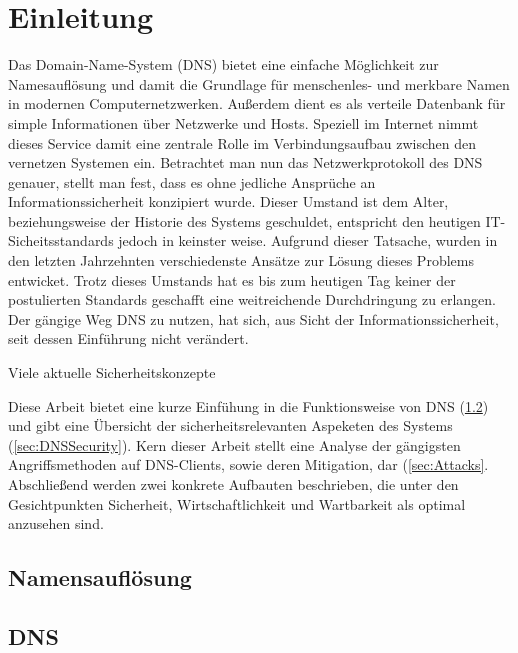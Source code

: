 \chapter{Einleitung}
Das Domain-Name-System (DNS) bietet eine einfache Möglichkeit zur Namesauflösung und damit die Grundlage für menschenles- und merkbare Namen in modernen Computernetzwerken. Außerdem dient es als verteile Datenbank für simple Informationen über Netzwerke und Hosts. Speziell im Internet nimmt dieses Service damit eine zentrale Rolle im Verbindungsaufbau zwischen den vernetzen Systemen ein. Betrachtet man nun das Netzwerkprotokoll des DNS genauer, stellt man fest, dass es ohne jedliche Ansprüche an Informationssicherheit konzipiert wurde. Dieser Umstand ist dem Alter, beziehungsweise der Historie des Systems geschuldet, entspricht den heutigen IT-Sicheitsstandards jedoch in keinster weise. Aufgrund dieser Tatsache, wurden in den letzten Jahrzehnten verschiedenste Ansätze zur Lösung dieses Problems entwicket. Trotz dieses Umstands hat es bis zum heutigen Tag keiner der postulierten Standards geschafft eine weitreichende Durchdringung zu erlangen. Der gängige Weg DNS zu nutzen, hat sich, aus Sicht der Informationssicherheit, seit dessen Einführung nicht verändert.

Viele aktuelle Sicherheitskonzepte 

Diese Arbeit bietet eine kurze Einfühung in die Funktionsweise von DNS (\ref{sec:DNS}) und gibt eine Übersicht der sicherheitsrelevanten Aspeketen des Systems (\ref{sec:DNSSecurity}). Kern dieser Arbeit stellt eine Analyse der gängigsten Angriffsmethoden auf DNS-Clients, sowie deren Mitigation, dar (\ref{sec:Attacks}. Abschließend werden zwei konkrete Aufbauten beschrieben, die unter den Gesichtpunkten Sicherheit, Wirtschaftlichkeit und Wartbarkeit als optimal anzusehen sind. 

\section{Namensauflösung}

\section{DNS}
\label{sec:DNS}

